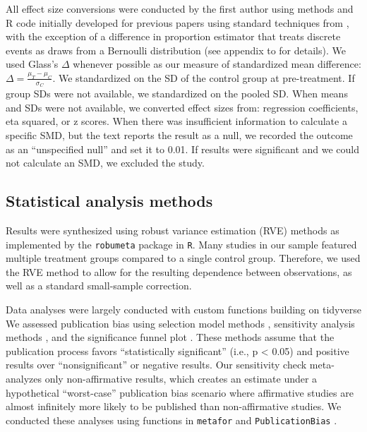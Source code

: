 \documentclass[sn-nature,referee,pdflatex]{sn-jnl}
\begin{document}
All effect size conversions were conducted by the first author using
methods and R code initially developed for previous papers
\citep{paluck2019, paluck2021, porat2024} using standard techniques from
\citep{cooper2019}, with the exception of a difference in proportion
estimator that treats discrete events as draws from a Bernoulli
distribution (see appendix to \citep{paluck2021} for details). We used
Glass's \(\Delta\) whenever possible as our measure of standardized mean
difference: \(\Delta = \frac{\mu_T - \mu_C}{\sigma_C}\). We standardized
on the SD of the control group at pre-treatment. If group SDs were not
available, we standardized on the pooled SD. When means and SDs were not
available, we converted effect sizes from: regression coefficients, eta
squared, or z scores. When there was insufficient information to
calculate a specific SMD, but the text reports the result as a null, we
recorded the outcome as an ``unspecified null'' and set it to 0.01. If
results were significant and we could not calculate an SMD, we excluded
the study.

\subsection{Statistical analysis methods}\label{sec3.4}

Results were synthesized using robust variance estimation (RVE) methods
\citep{hedges2010} as implemented by the \texttt{robumeta} package
\citep{fisher2015} in \texttt{R}\citep{Rlang}. Many studies in our
sample featured multiple treatment groups compared to a single control
group. Therefore, we used the RVE method to allow for the resulting
dependence between observations, as well as a standard small-sample
correction.

Data analyses were largely conducted with custom functions building on
tidyverse \citep{wickham2019} We assessed publication bias using
selection model methods \citep{hedges1992}, sensitivity analysis methods
\citep{mathur2024}, and the significance funnel plot \citep{mathur2020}.
These methods assume that the publication process favors ``statistically
significant'' (i.e., p \textless{} 0.05) and positive results over
``nonsignificant'' or negative results. Our sensitivity check
meta-analyzes only non-affirmative results, which creates an estimate
under a hypothetical ``worst-case'' publication bias scenario where
affirmative studies are almost infinitely more likely to be published
than non-affirmative studies. We conducted these analyses using
functions in \texttt{metafor} \citep{viechtbauer2020} and
\texttt{PublicationBias} \citep{mathur2020, mathur2024}.
\end{document}
